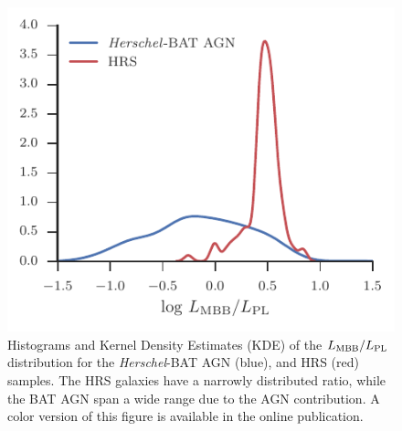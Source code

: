 \documentclass[fleqn, usenatbib]{mnras}
\newcommand{\herschel}{\emph{Herschel}}
\begin{document}


\begin{figure}
\includegraphics[width=\columnwidth]{figures/lmbb-lpl-ratio-hrs-mass-select}
\caption{Histograms and Kernel Density Estimates (KDE) of the $L_{\rm MBB}/L_{\rm PL}$ distribution for the \herschel-BAT AGN (blue), and HRS (red) samples. The HRS galaxies have a narrowly distributed ratio, while the BAT AGN span a wide range due to the AGN contribution. A color version of this figure is available in the online publication. \label{fig:lmbb_lpl_ratio}}
\end{figure}
\end{document}

